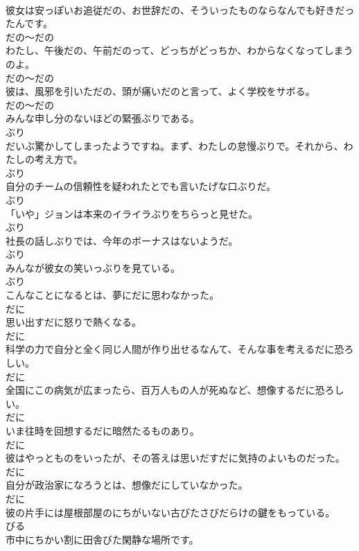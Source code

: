 \documentclass[8pt]{extreport}
\begin{document}
\begin{CJK}{UTF8}{min}
\\	彼女は安っぽいお追従だの、お世辞だの、そういったものならなんでも好きだったんです。	
\\	だの～だの
\\	わたし、午後だの、午前だのって、どっちがどっちか、わからなくなってしまうのよ。	
\\	だの～だの
\\	彼は、風邪を引いただの、頭が痛いだのと言って、よく学校をサボる。	
\\	だの～だの
\\	みんな申し分のないほどの緊張ぶりである。	
\\	ぶり
\\	だいぶ驚かしてしまったようですね。まず、わたしの怠慢ぶりで。それから、わたしの考え方で。	
\\	ぶり
\\	自分のチームの信頼性を疑われたとでも言いたげな口ぶりだ。	
\\	ぶり
\\	「いや」ジョンは本来のイライラぶりをちらっと見せた。	
\\	ぶり
\\	社長の話しぶりでは、今年のボーナスはないようだ。	
\\	ぶり
\\	みんなが彼女の笑いっぶりを見ている。	
\\	ぶり
\\	こんなことになるとは、夢にだに思わなかった。	
\\	だに
\\	思い出すだに怒りで熱くなる。	
\\	だに
\\	科学の力で自分と全く同じ人間が作り出せるなんて、そんな事を考えるだに恐ろしい。	
\\	だに
\\	全国にこの病気が広まったら、百万人もの人が死ぬなど、想像するだに恐ろしい。	
\\	だに
\\	いま往時を回想するだに暗然たるものあり。	
\\	だに
\\	彼はやっとものをいったが、その答えは思いだすだに気持のよいものだった。	
\\	だに
\\	自分が政治家になろうとは、想像だにしていなかった。	
\\	だに
\\	彼の片手には屋根部屋のにちがいない古びたさびだらけの鍵をもっている。	
\\	びる
\\	市中にちかい割に田舎びた閑静な場所です。	

\end{CJK}
\end{document}
